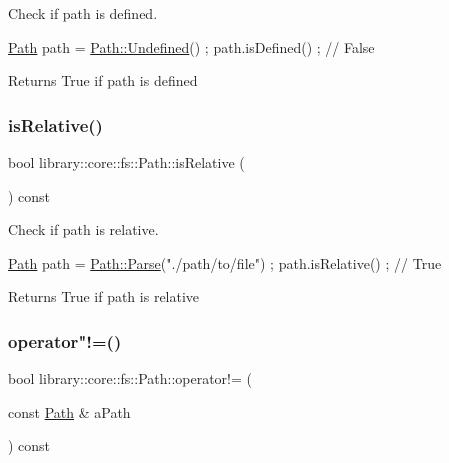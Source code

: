 Check if path is defined. 


\begin{DoxyCode}
\hyperlink{classlibrary_1_1core_1_1fs_1_1_path_aabc4240fc08479d1bff6b9753f2b5cc2}{Path} path = \hyperlink{classlibrary_1_1core_1_1fs_1_1_path_a0bb46bc56bc1bb180b114bae32477e06}{Path::Undefined}() ;
path.isDefined() ; \textcolor{comment}{// False}
\end{DoxyCode}


\begin{DoxyReturn}{Returns}
True if path is defined 
\end{DoxyReturn}
\mbox{\label{classlibrary_1_1core_1_1fs_1_1_path_a97cf61b699efe17e23ac3a91daf897e2}} 
\subsubsection{\texorpdfstring{is\+Relative()}{isRelative()}}
{\footnotesize\ttfamily bool library\+::core\+::fs\+::\+Path\+::is\+Relative (\begin{DoxyParamCaption}{ }\end{DoxyParamCaption}) const}



Check if path is relative. 


\begin{DoxyCode}
\hyperlink{classlibrary_1_1core_1_1fs_1_1_path_aabc4240fc08479d1bff6b9753f2b5cc2}{Path} path = \hyperlink{classlibrary_1_1core_1_1fs_1_1_path_a6ba644b6609507e724c217bf2020f5ae}{Path::Parse}(\textcolor{stringliteral}{"./path/to/file"}) ;
path.isRelative() ; \textcolor{comment}{// True}
\end{DoxyCode}


\begin{DoxyReturn}{Returns}
True if path is relative 
\end{DoxyReturn}
\mbox{\label{classlibrary_1_1core_1_1fs_1_1_path_a79b3a6951753c591bab57ee41f7c4c6f}} 
\subsubsection{\texorpdfstring{operator"!=()}{operator!=()}}
{\footnotesize\ttfamily bool library\+::core\+::fs\+::\+Path\+::operator!= (\begin{DoxyParamCaption}\item[{const \hyperlink{classlibrary_1_1core_1_1fs_1_1_path}{Path} \&}]{a\+Path }\end{DoxyParamCaption}) const}



